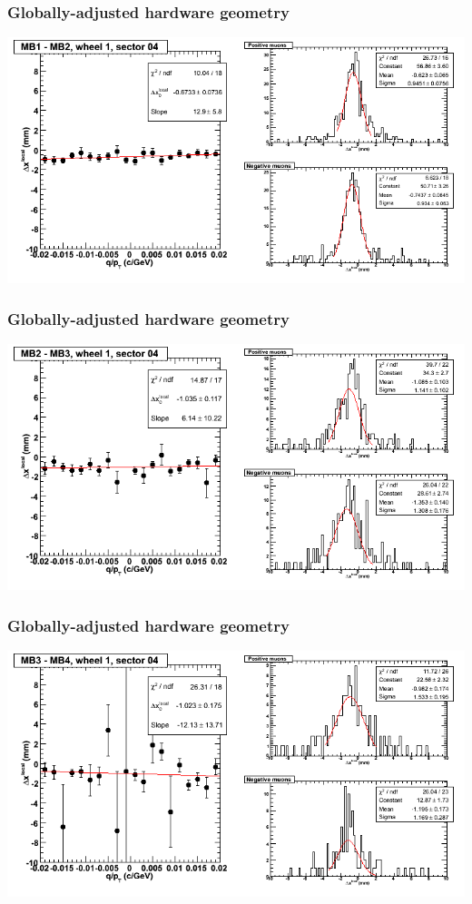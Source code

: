\documentclass[compress]{beamer}
\begin{document}
\begin{frame}
\frametitle{Globally-adjusted hardware geometry}
\includegraphics[width=\linewidth]{NOV4_segdiffs_HW/dt13_resid_D_04_12.png}
\end{frame}

\begin{frame}
\frametitle{Globally-adjusted hardware geometry}
\includegraphics[width=\linewidth]{NOV4_segdiffs_HW/dt13_resid_D_04_23.png}
\end{frame}

\begin{frame}
\frametitle{Globally-adjusted hardware geometry}
\includegraphics[width=\linewidth]{NOV4_segdiffs_HW/dt13_resid_D_04_34.png}
\end{frame}
\end{document}
